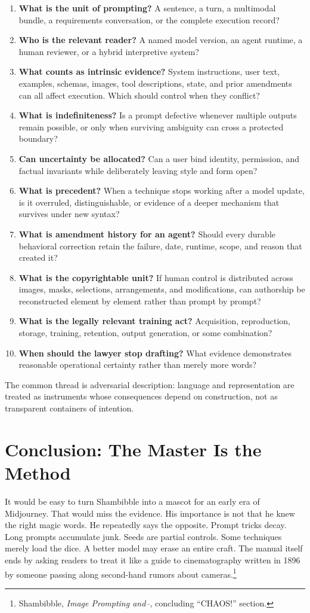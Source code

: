 \documentclass[11pt]{article}
\begin{document}
\begin{enumerate}[leftmargin=1.7em]
\item \textbf{What is the unit of prompting?} A sentence, a turn, a multimodal bundle, a requirements conversation, or the complete execution record?
\item \textbf{Who is the relevant reader?} A named model version, an agent runtime, a human reviewer, or a hybrid interpretive system?
\item \textbf{What counts as intrinsic evidence?} System instructions, user text, examples, schemas, images, tool descriptions, state, and prior amendments can all affect execution. Which should control when they conflict?
\item \textbf{What is indefiniteness?} Is a prompt defective whenever multiple outputs remain possible, or only when surviving ambiguity can cross a protected boundary?
\item \textbf{Can uncertainty be allocated?} Can a user bind identity, permission, and factual invariants while deliberately leaving style and form open?
\item \textbf{What is precedent?} When a technique stops working after a model update, is it overruled, distinguishable, or evidence of a deeper mechanism that survives under new syntax?
\item \textbf{What is amendment history for an agent?} Should every durable behavioral correction retain the failure, date, runtime, scope, and reason that created it?
\item \textbf{What is the copyrightable unit?} If human control is distributed across images, masks, selections, arrangements, and modifications, can authorship be reconstructed element by element rather than prompt by prompt?
\item \textbf{What is the legally relevant training act?} Acquisition, reproduction, storage, training, retention, output generation, or some combination?
\item \textbf{When should the lawyer stop drafting?} What evidence demonstrates reasonable operational certainty rather than merely more words?
\end{enumerate}

The common thread is adversarial description: language and representation are treated as instruments whose consequences depend on construction, not as transparent containers of intention.

\section*{Conclusion: The Master Is the Method}
It would be easy to turn Shambibble into a mascot for an early era of Midjourney. That would miss the evidence. His importance is not that he knew the right magic words. He repeatedly says the opposite. Prompt tricks decay. Long prompts accumulate junk. Seeds are partial controls. Some techniques merely load the dice. A better model may erase an entire craft. The manual itself ends by asking readers to treat it like a guide to cinematography written in 1896 by someone passing along second-hand rumors about cameras.\footnote{Shambibble, \emph{Image Prompting and--}, concluding ``CHAOS!'' section.}
\end{document}
